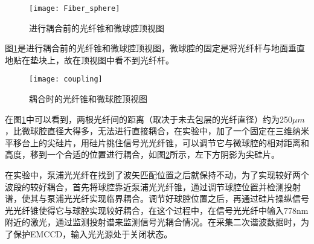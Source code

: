 \begin{figure}
\centering
\texttt{[image: Fiber\_sphere]}
\caption{进行耦合前的光纤锥和微球腔顶视图}
\label{pic:Fiber_sphere}
\end{figure}

图\ref{pic:Fiber_sphere}是进行耦合前的光纤锥和微球腔顶视图，微球腔的固定是将光纤杆与地面垂直地贴在垫块上，故在顶视图中看不到光纤杆。

\begin{figure}
\centering
\texttt{[image: coupling]}
\caption{耦合时的光纤锥和微球腔顶视图}
\label{pic:coupling}
\end{figure}

在图\ref{pic:Fiber_sphere}中可以看到，两根光纤间的距离（取决于未去包层的光纤直径）约为250$\mu m$，比微球腔直径大得多，无法进行直接耦合，在实验中，加了一个固定在三维纳米平移台上的尖硅片，用硅片挑住信号光光纤锥，可以调节它与微球腔的相对距离和高度，移到一个合适的位置进行耦合，如图\ref{pic:coupling}所示，左下方阴影为尖硅片。

在实验中，泵浦光光纤在找到了波矢匹配位置之后就保持不动，为了实现较好两个波段的较好耦合，首先将球腔靠近泵浦光光纤锥，通过调节球腔位置并检测投射谱，使其与泵浦光光纤实现临界耦合。调节好球腔位置之后，再通过硅片操纵信号光光纤锥使得它与球腔实现较好耦合，在这个过程中，在信号光光纤中输入778nm附近的激光，通过监测投射谱来监测信号光耦合情况。在采集二次谐波数据时，为了保护EMCCD，输入光光源处于关闭状态。
